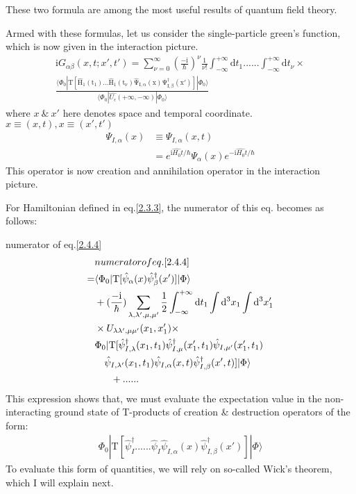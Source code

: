 These two formula are among the most useful results of quantum field theory.


Armed with these formulas, let us consider the  single-particle green's function, which is now given in the interaction picture.
\begin{align}\label{2.4.4}
\mathrm{i}G_{\alpha\beta}(x,t;x',t')=\sum_{\nu=0}^{\infty}(\frac{-\mathrm{i}}{\hbar})^{\nu} \frac{1}{\nu!} \int_{-\infty}^{+\infty}\mathrm{d}t_1......\int_{-\infty}^{+\infty}\mathrm{d}t_{\nu}\times\nonumber  \\
\frac{\langle\Phi_0|\mathrm{T[\hat H_1(t_1)...\hat H_1(t_{\nu})\hat \Psi_{I,\alpha}(x)\Psi^{\dagger}_{I,\beta}(x')]}
|\Phi_0\rangle}{\langle\Phi_0|\hat{U_{\epsilon}}(+\infty,-\infty)|\Phi_0\rangle}
\end{align}
where $x\ \&\ x'$ here denotes space and temporal coordinate.$x\equiv(x,t),x\equiv (x',t')$
\begin{align}
\Psi_{I,\alpha}(x)&\equiv\Psi_{I,\alpha}(x,t) \nonumber \\
&=e^{\mathrm{i}\hat{H_0}t/\hbar}\Psi_{\alpha}(x)e^{-\mathrm{i}\hat{H_0}t/\hbar} \nonumber
\end{align}
This operator is now creation and annihilation operator in the interaction picture.

For Hamiltonian defined in eq.\eqref{2.3.3}, the numerator of this eq. becomes as follows:

numerator of eq.\eqref{2.4.4}
\begin{align}\label{2.4.5}
& numerator of eq.\eqref{2.4.4} \nonumber \\
=&\langle \Phi_0|\mathrm{T}[\hat \psi_{\alpha }(x)\hat \psi_{\beta }^{\dagger}(x')]|\Phi\rangle \nonumber \\
&+(\frac{-\mathrm{i}}{\hbar})\sum_{\lambda,\lambda',\mu,\mu'}\frac{1}{2}\int_{-\infty}^{+\infty}\mathrm{d}t_1\int\mathrm{d}^3x_1\int\mathrm{d}^3x_1' \nonumber \\
&\times U_{\lambda\lambda',\mu\mu'}(x_1,x_1')\times \nonumber\\
&\Phi_0|\mathrm{T}[\hat \psi_{I,\lambda}^{\dagger}(x_1,t_1)\hat \psi_{I,\mu}^{\dagger}(x_1',t_1)\hat \psi_{I,\mu' }(x_1',t_1) \nonumber \\
&\ \ \ \hat \psi_{I,\lambda' }(x_1,t_1)\hat \psi_{I,\alpha}(x,t)\hat \psi^{\dagger}_{I,\beta }(x',t)]|\Phi\rangle \nonumber \\
&\ \ \ \ \ +......
\end{align}
This expression shows that, we must evaluate the expectation value in the non-interacting ground state of T-products of creation \& destruction operators of the form:
\begin{align}
\Phi_0|\mathrm{T}[\hat \psi_{I}^{\dagger}......\hat \psi_{I}\hat \psi_{I,\alpha}(x)\hat \psi^{\dagger}_{I,\beta }(x')]|\Phi\rangle \nonumber 
\end{align}
To evaluate this form of quantities, we will rely on so-called Wick's theorem, which I will explain next.


